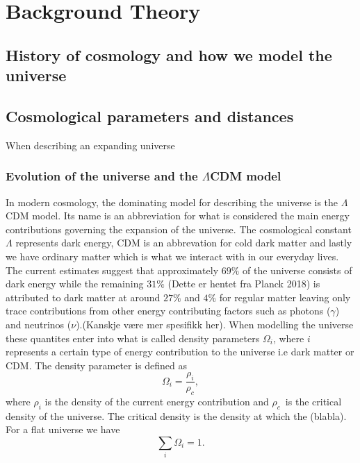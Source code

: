 \chapter{Background Theory}
\section{History of cosmology and how we model the universe}

\section{Cosmological parameters and distances}
When describing an expanding universe
\subsection{Evolution of the universe and the $\Lambda$CDM model}
In modern cosmology, the dominating model for describing the universe is the $\Lambda$CDM model. Its name is an abbreviation for what 
is considered the main energy contributions governing the expansion of the universe. The cosmological constant $\Lambda$ represents dark energy, CDM is an abbrevation for cold dark matter
and lastly we have ordinary matter which is what we interact with in our everyday lives. The current estimates suggest that approximately $69\%$ of the universe consists of dark energy while the remaining $31\%$ (Dette er hentet fra Planck 2018) is attributed to dark matter at around 
$27\%$ and $4\%$ for regular matter leaving only trace contributions from other energy contributing factors such as photons ($\gamma$) and neutrinos ($\nu$).(Kanskje være mer spesifikk her). When modelling the universe these quantites enter into 
what is called density parameters $\Omega_i$, where $i$ represents a certain type of energy contribution to the universe i.e dark matter or CDM. The density parameter is defined as
\begin{equation}
    \Omega_i = \frac{\rho_i}{\rho_c},
\end{equation}
where $\rho_i$ is the density of the current energy contribution and $\rho_c$ is the critical density of the universe. The critical density is the density at which the (blabla). For a flat universe we have
\begin{equation}
    \sum_i \Omega_i = 1.
\end{equation}




